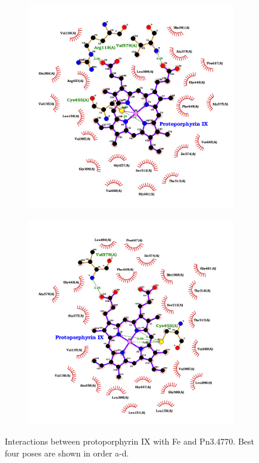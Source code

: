 \documentclass[12pt]{article}
\begin{document}
\begin{figure}[h!]
\begin{subfigure}[h!]{0.35\textwidth}
			\caption{}
		\end{subfigure}
		\hfill
		\begin{subfigure}[h!]{0.35\textwidth}
			\hspace{2cm}
			\includegraphics[width=\textwidth]{../5/known/Dock/best3.png}
			\caption{}
		\end{subfigure}
		\hfill
		\begin{subfigure}[h!]{0.35\textwidth}
			\hspace{-2cm}
			\includegraphics[width=\textwidth]{../5/known/Dock/best4.png}
			\caption{}
		\end{subfigure}
		\hfill
		\caption[Interactions between protoporphyrin IX with Fe and Pn3.4770.]{\centering Interactions between protoporphyrin IX with Fe and Pn3.4770. Best four poses are shown in order a-d.}
		\label{fig5k_4}
	\end{figure}
\end{document}
